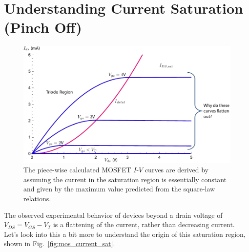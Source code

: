 \section{Understanding Current Saturation (Pinch Off)}
\begin{figure}[tb]
\centering
\includegraphics[width=.75\columnwidth]{ids_idsat_full} 
\caption{The piece-wise calculated MOSFET $I$-$V$ curves are derived by assuming the current in the saturation region is essentially constant and given by the maximum value predicted from the square-law relations.}
\label{fig:ids_family}
\end{figure}
The observed experimental behavior of devices beyond a drain voltage of $V_{DS} = V_{GS} - V_T$ is a flattening of the current, rather than decreasing current.  Let's look into this a bit more to understand the origin of this saturation region, shown in Fig.~\ref{fig:mos_current_sat}.
